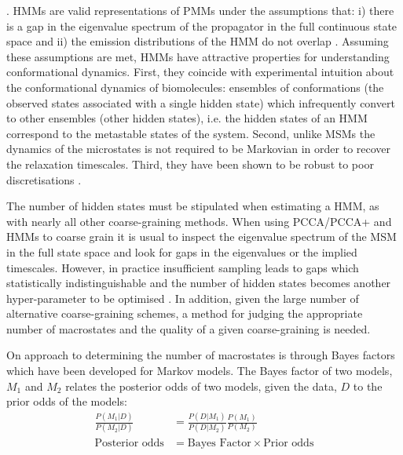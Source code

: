 \cite{mondalAtomicResolutionMechanism2018a}\cite{plattnerCompleteProteinProtein2017}\cite{panConformationalHeterogeneityMichaelis2016}\cite{juarez-jimenezDynamicDesignManipulation2020}\cite{wangDynamicalBehaviorVLactamases2019}\cite{FastFoldingPathwaysThrombinBinding2018}\cite{remingtonFluorescenceQuenching2aminopurinelabeled2019}\cite{curado-carballadaHiddenConformationsAspergillus2019}\cite{furiniIontriggeredSelectivityBacterial2018}\cite{yangMappingPathwayDynamics2018}\cite{ahalawatMappingSubstrateRecognition2018}\cite{olaposiMembraneBoundTranscriptionFactor2019}\cite{xiaoNaBindingModes2019}\cite{hansonWhatMakesKinase2019}. HMMs are valid representations of PMMs under the assumptions that: i) there is a gap in the eigenvalue spectrum of the propagator in the full continuous state space and ii) the emission distributions of the HMM do not overlap \cite{noeProjectedHiddenMarkov2013a}. Assuming these assumptions are met, HMMs have attractive properties for understanding conformational dynamics.  First, they coincide with experimental intuition about the conformational dynamics of biomolecules:  ensembles of conformations (the observed states associated with a single hidden state) which infrequently convert to other ensembles (other hidden states), i.e. the hidden states of an HMM correspond to the metastable states of the system. Second, unlike MSMs the dynamics of the microstates is not required to be Markovian in order to recover the relaxation timescales. Third, they have been shown to be robust to poor discretisations \cite{noeProjectedHiddenMarkov2013a}.

The number of hidden states must be stipulated when estimating a HMM, as with nearly all other coarse-graining methods. When using PCCA/PCCA+ \cite{deuflhardIdentificationAlmostInvariant2000a}\cite{deuflhardRobustPerronCluster2005b} and HMMs\cite{noeProjectedHiddenMarkov2013a} to coarse grain it is usual to inspect the eigenvalue spectrum of the MSM in the full state space and look for gaps in the eigenvalues or the implied timescales. However, in practice insufficient sampling leads to gaps which statistically indistinguishable and the number of hidden states becomes another hyper-parameter to be optimised \cite{bowmanQuantitativeComparisonAlternative2013}. In addition, given the large number of alternative coarse-graining schemes, a method for judging the appropriate number of macrostates and the quality of a given coarse-graining  is needed. 

On approach to determining the number of macrostates is through Bayes factors\cite{kassBayesFactors1995} which have been developed \cite{bacalladoBayesianComparisonMarkov2009a} for Markov models. The Bayes factor of two models, $M_{1}$ and $M_{2}$ relates the posterior odds of two models, given the data, $D$ to the prior odds of the models: 
\begin{equation}
   \begin{split}
    \frac{P(M_1|D)}{P(M_2|D)} & = \frac{P(D|M_1)}{P(D|M_2)} \frac{P(M_1)}{P(M_2)}\\
     \text{Posterior odds} &= \text{Bayes Factor} \times \text{Prior odds}
\end{split} 
\end{equation}

